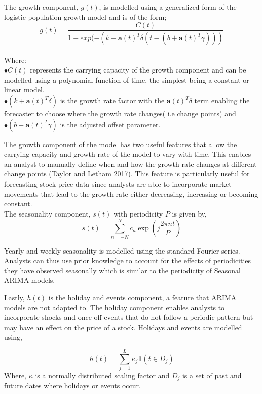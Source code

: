 \documentclass[12pt,a4paper]{article}
\numberwithin{equation}{section}
\numberwithin{figure}{section}
\numberwithin{table}{section}
\begin{document}
The growth component, \(g(t)\), is modelled using a generalized form of
the logistic population growth model and is of the form;\\
\[g(t) = \frac{C(t)}{1+exp(-(k+\boldsymbol{a}(t)^T \delta(t-(b+\boldsymbol{a}(t)^T \gamma)))}\]\\
Where:\\
\(\bullet C(t)\) represents the carrying capacity of the growth
component and can be modelled using a polynomial function of time, the
simplest being a constant or linear model.\\
\(\bullet (k+\boldsymbol{a}(t)^T\delta)\) is the growth rate factor with
the \(\boldsymbol{a}(t)^T\delta\) term enabling the forecaster to choose
where the growth rate changes( i.e change points) and\\
\(\bullet (b+\boldsymbol{a}(t)^T \gamma)\) is the adjusted offset
parameter.

The growth component of the model has two useful features that allow the
carrying capacity and growth rate of the model to vary with time. This
enables an analyst to manually define when and how the growth rate
changes at different change points (Taylor and Letham 2017). This
feature is particularly useful for forecasting stock price data since
analysts are able to incorporate market movements that lead to the
growth rate either decreasing, increasing or becoming constant.\\
The seasonality component, \(s(t)\) with periodicity \(P\) is given by,
\[s(t) = \sum_{n = -N}^{N}c_n \exp(j\frac{2\pi nt}{P})\]

Yearly and weekly seasonality is modelled using the standard Fourier
series. Analysts can thus use prior knowledge to account for the effects
of periodicities they have observed seasonally which is similar to the
periodicity of Seasonal ARIMA models.

Lastly, \(h(t)\) is the holiday and events component, a feature that
ARIMA models are not adapted to. The holiday component enables analysts
to incorporate shocks and once-off events that do not follow a periodic
pattern but may have an effect on the price of a stock. Holidays and
events are modelled using,

\[ h(t) = \sum_{j = 1}^{L}\kappa_j \boldsymbol{1}(t \in D_j) \label{eqn5}
\] Where, \(\kappa\) is a normally distributed scaling factor and
\(D_j\) is a set of past and future dates where holidays or events
occur.
\end{document}
